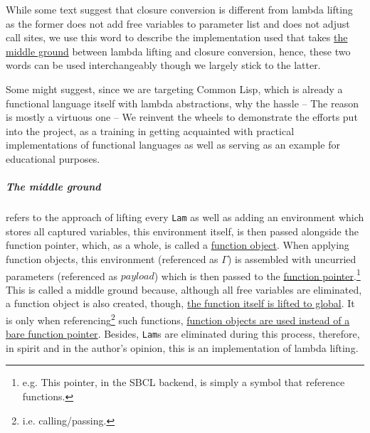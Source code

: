 \documentclass[a4paper, 11pt]{article}
\theoremstyle{remark}\newtheorem*{remark}{Remark}
\theoremstyle{definition}\newtheorem*{definition}{Definition}
\begin{document}
While some text suggest that closure conversion is different from lambda lifting as the former does not
add free variables to parameter list and does not adjust call sites, we use this word to describe
the implementation \Tigris used that takes \underline{the middle ground} between lambda lifting
and closure conversion, hence, these two words can be used interchangeably though we largely
stick to the latter.

Some might suggest, since we are targeting Common Lisp, which is already a functional language itself
with lambda abstractions, why the hassle --
The reason is mostly a virtuous one -- We reinvent the wheels to demonstrate the efforts put into the project,
as a training in getting acquainted with practical implementations of functional languages as well as
serving as an example for educational purposes.

\subparagraph{The middle ground} refers to the approach of lifting every \texttt{Lam} as well as
adding an environment which stores all captured variables, this environment itself, is then
passed alongside the function pointer, which, as a whole, is called a \underline{function object}. When applying
function objects, this environment (referenced as $\Gamma$) is assembled with uncurried parameters (referenced as $payload$)
which is then passed to the
\underline{function pointer}.\footnote{e.g. This pointer, in the SBCL backend, is simply a symbol that reference functions.}
This is called a middle ground because, although all free
variables are eliminated, a function object is also created, though, \underline{the function itself is
lifted to global}. It is only when referencing\footnote{i.e. calling/passing.} such functions, \underline{function objects are used instead of a bare function pointer}. Besides, \texttt{Lam}s are eliminated
during this process, therefore, in spirit and in the author's opinion, this is an implementation of
lambda lifting.
\end{document}
